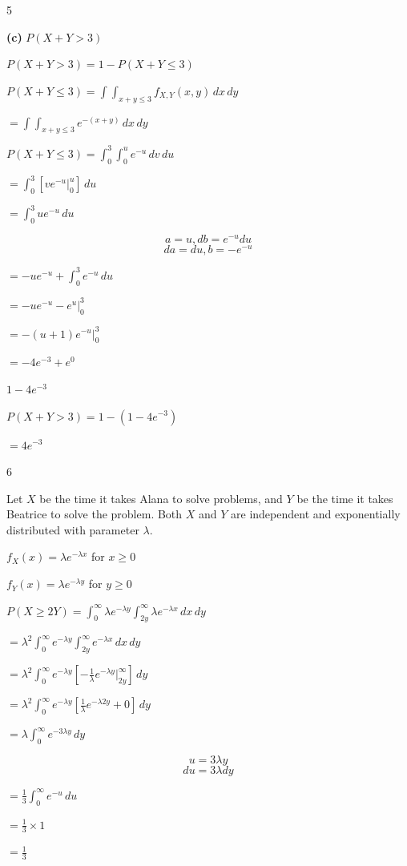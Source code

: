 \documentclass[12 pt]{article}
\begin{document}
\begin{exercise}{5}
    \hfill

    \textbf{(c)} $P(X+Y >3)$

    $P(X+Y>3) = 1 - P(X+Y \leq 3)$

    $P(X+Y \leq 3) = \int \int_{x+y \leq 3} f_{X,Y}(x,y) \, dx \, dy$

    $= \int \int_{x+y \leq 3} e^{-(x+y)} \, dx \, dy$

    \hfill

    $P(X+Y \leq 3) = \int_{0}^{3} \int_{0}^{u} e^{-u} \, dv \, du$

    $= \int_{0}^{3} [ve^{-u} |_{0}^{u}] \, du$

    $= \int_{0}^{3} u e^{-u} \, du$

    $$a = u, db = e^{-u} du$$
    $$da = du, b= -e^{-u}$$

    $= -ue^{-u} + \int_{0}^{3} e^{-u} \, du$

    $= -ue^{-u} - e^{u} |_{0}^{3}$

    $=-(u+1)e^{-u} |_{0}^{3}$

    $= -4e^{-3} + e^0$

    $1 - 4e^{-3}$

    \hfill

    $P(X+Y>3) = 1 - (1-4e^{-3})$

    $= 4e^{-3}$

    \hfill
    \end{exercise}



    \begin{exercise}{6}
    \hfill

    Let $X$ be the time it takes Alana to solve problems, and $Y$ be the time it takes Beatrice to solve the problem. Both $X$ and $Y$ are independent and exponentially distributed with parameter $\lambda$.

    $f_X(x) = \lambda e^{-\lambda x}$ for $x \geq 0$

    $f_Y(x) = \lambda e^{-\lambda y}$ for $y \geq 0$

    \hfill

    $P(X \geq 2Y) = \int_{0}^{\infty} \lambda e^{- \lambda y} \int_{2y}^{\infty} \lambda e^{-\lambda x} \, dx \, dy$

    $ = {\lambda}^2 \int_{0}^{\infty} e^{- \lambda y} \int_{2y}^{\infty}  e^{-\lambda x} \, dx \, dy$

    $ = {\lambda}^2 \int_{0}^{\infty} e^{- \lambda y} [-\frac{1}{\lambda}e^{-\lambda y} |_{2y}^{\infty}] \, dy$

    $ = {\lambda}^2 \int_{0}^{\infty} e^{- \lambda y} [\frac{1}{\lambda}e^{-\lambda 2y} + 0] \, dy$

    $ = \lambda \int_{0}^{\infty} e^{-3 \lambda y} \, dy$

    $$u = 3 \lambda y$$
    $$du = 3 \lambda dy$$

    $= \frac{1}{3} \int_{0}^{\infty} e^{-u} \, du$

    $= \frac{1}{3} \times 1$

    $= \frac{1}{3}$

    \hfill
    \end{exercise}
\end{document}
